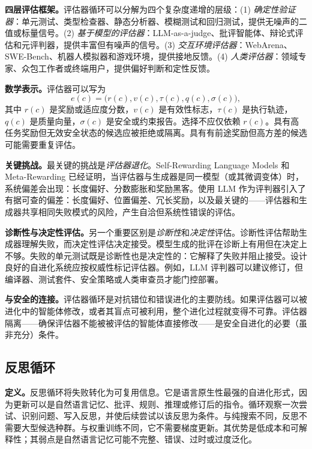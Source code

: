 \textbf{四层评估框架。}评估器循环可以分解为四个复杂度递增的层级：(1) \emph{确定性验证器}：单元测试、类型检查器、静态分析器、模糊测试和回归测试，提供无噪声的二值或标量信号。(2) \emph{基于模型的评估器}：LLM-as-a-judge、批评智能体、辩论式评估和元评判器，提供丰富但有噪声的信号。(3) \emph{交互环境评估器}：WebArena、SWE-Bench、机器人模拟器和游戏环境，提供接地反馈。(4) \emph{人类评估器}：领域专家、众包工作者或终端用户，提供偏好判断和定性反馈。

\textbf{数学表示。}评估器可以写为
\begin{equation}\label{eq:ch2-evaluator-object}
  e(c) = \bigl(r(c), v(c), \tau(c), q(c), \sigma(c)\bigr),
\end{equation}
其中 $r(c)$ 是奖励或适应度分数，$v(c)$ 是有效性标志，$\tau(c)$ 是执行轨迹，$q(c)$ 是质量向量，$\sigma(c)$ 是安全或约束报告。选择不应仅依赖 $r(c)$。具有高任务奖励但无效安全状态的候选应被拒绝或隔离。具有有前途奖励但高方差的候选可能需要重复评估。

\textbf{关键挑战。}最关键的挑战是\emph{评估器退化}。Self-Rewarding Language Models 和 Meta-Rewarding 已经证明，当评估器与生成器是同一模型（或其微调变体）时，系统偏差会出现：长度偏好、分数膨胀和奖励黑客。使用 LLM 作为评判器引入了有据可查的偏差：长度偏好、位置偏差、冗长奖励，以及最关键的——评估器和生成器共享相同失败模式的风险，产生自洽但系统性错误的评估。

\textbf{诊断性与决定性评估。}另一个重要区别是\emph{诊断性}和\emph{决定性}评估。诊断性评估帮助生成器理解失败，而决定性评估决定接受。模型生成的批评在诊断上有用但在决定上不够。失败的单元测试既是诊断性也是决定性的：它解释了失败并阻止接受。设计良好的自进化系统应按权威性标记评估器。例如，LLM 评判器可以建议修订，但编译器、测试套件、安全策略或人类审查员才能门控部署。

\textbf{与安全的连接。}评估器循环是对抗错位和错误进化的主要防线。如果评估器可以被进化中的智能体修改，或者其盲点可被利用，整个进化过程就变得不可靠。评估器隔离——确保评估器不能被被评估的智能体直接修改——是安全自进化的必要（虽非充分）条件。

\subsection{反思循环}\label{sec:ch2-reflection-loop}

\textbf{定义。}反思循环将失败转化为可复用信息。它是语言原生性最强的自进化形式，因为更新可以是自然语言记忆、批评、规则、推理或修订后的指令。循环观察一次尝试、识别问题、写入反思，并使后续尝试以该反思为条件。与纯搜索不同，反思不需要大型候选种群。与权重训练不同，它不需要梯度更新。其优势是低成本和可解释性；其弱点是自然语言记忆可能不完整、错误、过时或过度泛化。

